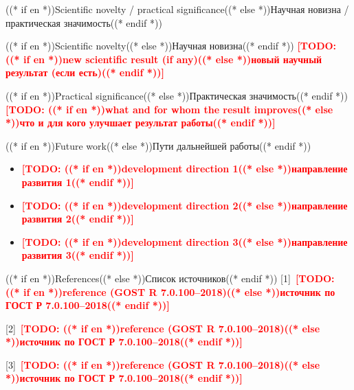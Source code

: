 \documentclass[aspectratio=169, 14pt]{beamer}
\newcommand{\todo}[1]{\textcolor{red}{\textbf{[TODO: #1]}}}
\begin{document}
\begin{frame}{((* if en *))Scientific novelty / practical significance((* else *))Научная новизна / практическая значимость((* endif *))}
  \begin{block}{((* if en *))Scientific novelty((* else *))Научная новизна((* endif *))}
    \todo{((* if en *))new scientific result (if any)((* else *))новый научный результат (если есть)((* endif *))}
  \end{block}

  \vspace{0.4em}
  \begin{block}{((* if en *))Practical significance((* else *))Практическая значимость((* endif *))}
    \todo{((* if en *))what and for whom the result improves((* else *))что и для кого улучшает результат работы((* endif *))}
  \end{block}
\end{frame}

\begin{frame}{((* if en *))Future work((* else *))Пути дальнейшей работы((* endif *))}
  \begin{itemize}
    \item \todo{((* if en *))development direction 1((* else *))направление развития 1((* endif *))}
    \item \todo{((* if en *))development direction 2((* else *))направление развития 2((* endif *))}
    \item \todo{((* if en *))development direction 3((* else *))направление развития 3((* endif *))}
  \end{itemize}
\end{frame}

\begin{frame}{((* if en *))References((* else *))Список источников((* endif *))}
  \small\setlength{\parskip}{0.5em}%
  [1]~\todo{((* if en *))reference (GOST R 7.0.100--2018)((* else *))источник по ГОСТ Р 7.0.100--2018((* endif *))}

  [2]~\todo{((* if en *))reference (GOST R 7.0.100--2018)((* else *))источник по ГОСТ Р 7.0.100--2018((* endif *))}

  [3]~\todo{((* if en *))reference (GOST R 7.0.100--2018)((* else *))источник по ГОСТ Р 7.0.100--2018((* endif *))}
\end{frame}
\end{document}
